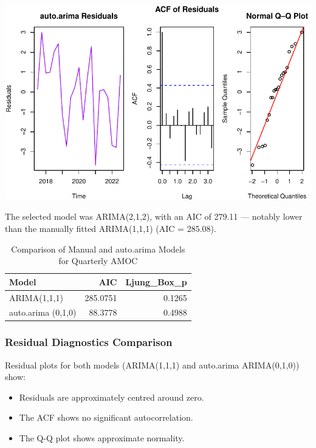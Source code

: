 \documentclass[
  11pt,
]{article}
\begin{document}
\includegraphics{project_files/figure-pdf/unnamed-chunk-48-2.pdf}

The selected model was ARIMA(2,1,2), with an AIC of 279.11 --- notably
lower than the manually fitted ARIMA(1,1,1) (AIC = 285.08).

\begin{table}
\caption*{
{\large Comparison of Manual and auto.arima Models for Quarterly AMOC}
} 
\fontsize{12.0pt}{14.4pt}\selectfont
\begin{tabular*}{\linewidth}{@{\extracolsep{\fill}}lrr}
\toprule
Model & AIC & Ljung\_Box\_p \\ 
\midrule\addlinespace[2.5pt]
ARIMA(1,1,1) & 285.0751 & 0.1265 \\ 
auto.arima (0,1,0) & 88.3778 & 0.4988 \\ 
\bottomrule
\end{tabular*}
\end{table}

\subsubsection{Residual Diagnostics
Comparison}\label{residual-diagnostics-comparison}

Residual plots for both models (ARIMA(1,1,1) and auto.arima
ARIMA(0,1,0)) show:

\begin{itemize}
\item
  Residuals are approximately centred around zero.
\item
  The ACF shows no significant autocorrelation.
\item
  The Q-Q plot shows approximate normality.
\end{itemize}
\end{document}
